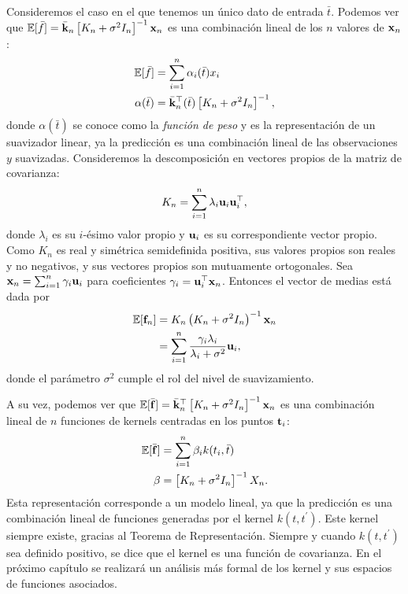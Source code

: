 Consideremos el caso en el que tenemos un único dato de entrada \(\bar{t}\). Podemos ver que \(\mathbb{E}[\bar{f}] = \bar{\mathbf{k}}_{n} \left[K_{n} + \sigma^2 I_n\right]^{-1}\mathbf{x}_n\) es una combinación lineal de los \(n\) valores de \(\mathbf{x}_n\):
\begin{align*}
	\mathbb{E}[\bar{f}]	&= \sum_{i=1}^{n} \alpha_i(\bar{t}) x_i\\
	\alpha(\bar{t})	&= \bar{\mathbf{k}}_{n}^{\top}(\bar{t}) \left[K_{n} + \sigma^2 I_n\right]^{-1},
\end{align*}
donde \(\alpha(\bar{t})\) se conoce como la \emph{función de peso} y es la representación de un suavizador linear, ya la predicción es una combinación lineal de las observaciones \(y\) suavizadas. Consideremos la descomposición en vectores propios de la matriz de covarianza:
\begin{equation*}
	K_{n} = \sum_{i=1}^{n} \lambda_i \mathbf{u}_i \mathbf{u}_i^{\top},
\end{equation*}
donde \(\lambda_i\) es su \(i\)-ésimo valor propio y \(\mathbf{u}_i\) es su correspondiente vector propio. Como \(K_{n}\) es real y simétrica semidefinida positiva, sus valores propios son reales y no negativos, y sus vectores propios son mutuamente ortogonales. Sea \(\mathbf{x}_n = \sum_{i=1}^{n} \gamma_i \mathbf{u}_i\) para coeficientes \(\gamma_i = \mathbf{u}_i^{\top} \mathbf{x}_n\). Entonces el vector de medias está dada por
\begin{align*}
	\mathbb{E}[\mathbf{f}_{n}]	&= K_{n} \left(K_{n} + \sigma^2 I_n\right)^{-1}\mathbf{x}_n \\
					&= \sum_{i=1}^{n} \frac{\gamma_i \lambda_i}{\lambda_i + \sigma^2} \mathbf{u}_i,
\end{align*}
donde el parámetro \(\sigma^2\) cumple el rol del nivel de suavizamiento.

A su vez, podemos ver que \(\mathbb{E}[\bar{\mathbf{f}}] = \bar{\mathbf{k}}_{n}^{\top} \left[K_{n} + \sigma^2 I_n\right]^{-1} \mathbf{x}_n\) es una combinación lineal de \(n\) funciones de kernels centradas en los puntos \(\mathbf{t}_i\):
\begin{align*}
	\mathbb{E}[\bar{\mathbf{f}}]	&= \sum_{i=1}^{n} \beta_i k(t_i, \bar{t})\\
	\beta				&= \left[K_{n} + \sigma^2 I_n\right]^{-1} X_n.
\end{align*}%
Esta representación corresponde a un modelo lineal, ya que la predicción es una combinación lineal de funciones generadas por el kernel \(k(t, t^{\prime})\). Este kernel siempre existe, gracias al Teorema de Representación. Siempre y cuando \(k(t, t^{\prime})\) sea definido positivo, se dice que el kernel es una función de covarianza. En el próximo capítulo se realizará un análisis más formal de los kernel y sus espacios de funciones asociados.



